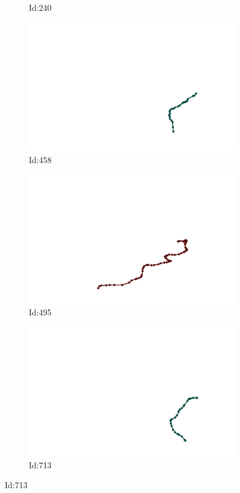 \documentclass[12pt,twoside]{report}
\begin{document}
\begin{figure}
\begin{subfigure}[b]{0.20\textwidth}
\caption{Id:240}
\end{subfigure}
\begin{subfigure}[b]{0.20\textwidth}
\centering
\includegraphics[width=\textwidth]{../../trajectories/458.png}
\caption{Id:458}
\end{subfigure}
\begin{subfigure}[b]{0.20\textwidth}
\centering
\includegraphics[width=\textwidth]{../../trajectories/495.png}
\caption{Id:495}
\end{subfigure}
\begin{subfigure}[b]{0.20\textwidth}
\centering
\includegraphics[width=\textwidth]{../../trajectories/713.png}
\caption{Id:713}
\end{subfigure}
\end{figure}
\end{document}
